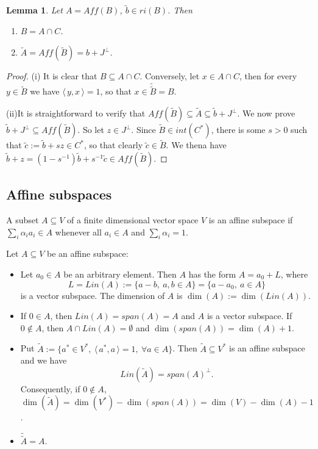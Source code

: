 \documentclass[12pt]{article}
\newtheorem{lemma}{Lemma}
\theoremstyle{definition}
\theoremstyle{remark}
\def\<{\langle\,}
\def\>{\,\rangle}
\begin{document}
\begin{lemma}\label{lemma:affine} Let $A=Aff(B)$, $\tilde b\in ri(B)$. Then 
\begin{enumerate}
\item[(i)] $B=A\cap C$.
\item[(ii)] $\tilde A=Aff(\tilde B)=b+J^\perp$.
\end{enumerate}


\end{lemma}

\begin{proof} (i) \enspace It is clear that $B\subseteq A\cap C$. Conversely, let $x\in A\cap C$, then
for every $y\in \tilde B$ we have $\<y,x\>=1$, so that $x\in \tilde{\tilde
B}=B$.   

(ii)\enspace It is straightforward to verify that $Aff(\tilde B)\subseteq \tilde
A\subseteq \tilde b+J^\perp$. We now prove $\tilde b+J^\perp\subseteq Aff(\tilde B)$. So
let $z\in J^\perp$. Since $\tilde B\in int(C^*)$, there is some $s>0$ such that $\tilde
c:=\tilde
b+sz \in C^*$, so that clearly $\tilde c\in \tilde B$. We thena have
$\tilde b +z=(1-s^{-1})\tilde b+s^{-1}\tilde c\in Aff(\tilde B)$.


\end{proof}
\subsection{Affine subspaces}


A subset $A\subseteq V$ of a finite dimensional vector space $V$ is an affine subspace if 
$\sum_i\alpha_i a_i\in A$ whenever all $a_i\in A$ and $\sum_i\alpha_i=1$. 

Let $A\subseteq V$ be an affine subspace:
\begin{itemize}
\item Let $a_0\in A$ be an arbitrary element. Then $A$ has the form $A=a_0+L$, where 
\[
L=Lin(A):=\{a-b,\ a,b\in A\}=\{a-a_0,\ a\in A\}
\]
is a vector subspace. The dimension of $A$ is $\dim(A):=\dim(Lin(A))$. 
\item If $0\in A$, then $Lin(A)=span(A)=A$ and $A$ is a vector subspace. If $0\notin A$,
then $A\cap Lin(A)=\emptyset$ and  $\dim(span(A))=\dim(A)+1$.

\item Put $\tilde A:=\{a^*\in V^*,\ \<a^*,a\>=1,\ \forall a\in A\}$. Then $\tilde
A\subseteq V^*$ is an affine subspace and we have 
\[
Lin(\tilde A)=span(A)^\perp.
\]
Consequently, if $0\notin A$, $\dim(\tilde A)=\dim(V^*)-\dim(span(A))=\dim(V)-\dim(A)-1$.
\item $\tilde{\tilde A}=A$.

\end{itemize}
\end{document}
